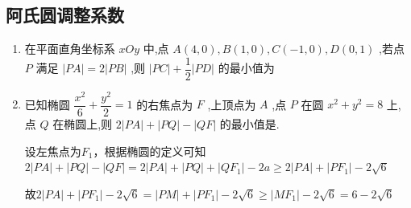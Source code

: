 \subsection*{阿氏圆调整系数}
\begin{enumerate}
    \item 在平面直角坐标系 $xOy$ 中,点 $A(4,0) ,B(1,0) ,C(-1,0) ,D(0,1)$ ,若点 $P$ 满足 $|PA| = 2|PB|$ ,则 $|PC| + \dfrac{1}{2}|PD|$ 的最小值为
    \item 已知椭圆 $\dfrac{{x}^{2}}{6} + \dfrac{{y}^{2}}{2} = 1$ 的右焦点为 $F$ ,上顶点为 $A$ ,点 $P$ 在圆 ${x}^{2} + {y}^{2} = 8$ 上,点 $Q$ 在椭圆上,则 $2\left| {PA}\right|  + \left| {PQ}\right|  - \left| {QF}\right|$ 的最小值是.
    \begin{jieda}
        设左焦点为$F_1$，根据椭圆的定义可知$2\left| {PA}\right|  + \left| {PQ}\right|  - \left| {QF}\right| = 2\left| {PA}\right|  + \left| {PQ}\right|  + \left| {QF_1}\right| - 2a \geq 2|PA| + |PF_1| - 2\sqrt{6}$

        

        故$2|PA| + |PF_1| - 2\sqrt{6} = |PM| + |PF_1| - 2\sqrt{6} \geq |MF_1| - 2\sqrt{6} = 6-2\sqrt{6}$
    \end{jieda}
\end{enumerate}
